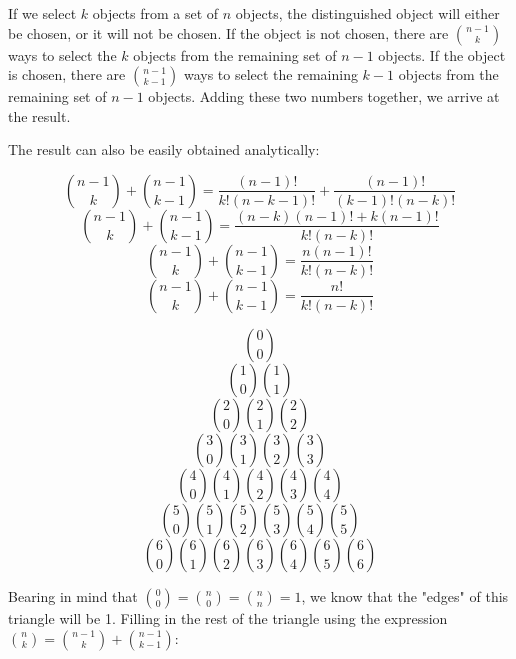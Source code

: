 \documentclass[a4paper,12pt]{article}
\begin{document}
If we select $k$ objects from a set of $n$ objects, the distinguished object will either be chosen, or it will not be chosen. 
If the object is not chosen, there are $\binom{n-1}{k}$ ways to select the $k$ objects from the remaining set of $n-1$ objects.
If the object is chosen, there are $\binom{n-1}{k-1}$ ways to select the remaining $k-1$ objects from the remaining set of $n-1$ objects. 
Adding these two numbers together, we arrive at the result. 

The result can also be easily obtained analytically:

\[ \binom{n-1}{k} + \binom{n-1}{k-1} = \frac{(n-1)!}{k!(n-k-1)!} + \frac{(n-1)!}{(k-1)!(n-k)!}\] 
\[ \binom{n-1}{k} + \binom{n-1}{k-1} = \frac{(n-k)(n-1)! + k(n-1)!}{k!(n-k)!} \]
\[ \binom{n-1}{k} + \binom{n-1}{k-1} = \frac{n(n-1)!}{k!(n-k)!} \]
\[ \binom{n-1}{k} + \binom{n-1}{k-1} = \frac{n!}{k!(n-k)!} \]

\vspace{5mm}

\[ \binom{0}{0} \]
\[ \binom{1}{0} \binom{1}{1} \]
\[ \binom{2}{0} \binom{2}{1} \binom{2}{2} \]
\[ \binom{3}{0} \binom{3}{1} \binom{3}{2} \binom{3}{3} \]
\[ \binom{4}{0} \binom{4}{1} \binom{4}{2} \binom{4}{3} \binom{4}{4} \]
\[ \binom{5}{0} \binom{5}{1} \binom{5}{2} \binom{5}{3} \binom{5}{4} \binom{5}{5} \]
\[ \binom{6}{0} \binom{6}{1} \binom{6}{2} \binom{6}{3} \binom{6}{4} \binom{6}{5} \binom{6}{6} \]

Bearing in mind that $\binom{0}{0} = \binom{n}{0} = \binom{n}{n} = 1$, we know that the "edges" of this triangle
will be 1. Filling in the rest of the triangle using the expression $\binom{n}{k} = \binom{n-1}{k} + \binom{n-1}{k-1}$:
\end{document}
